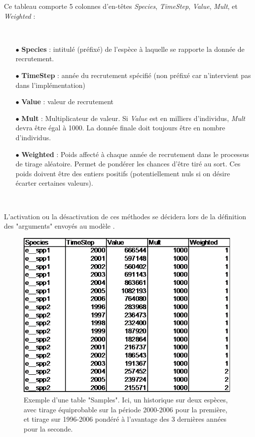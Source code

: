 \documentclass[12pt, colorinlistoftodos, notitlepage]{report}
\newenvironment{not used}[1]{%
    \longtable{%
        |>{\centering$\displaystyle}A{#1}{1}<{$}%
        |}\hline\ignorespaces}{%
    \endlongtable\ignorespacesafterend}
\begin{document}
Ce tableau comporte 5 colonnes d'en-têtes \textit{Species}, \textit{TimeStep}, \textit{Value}, \textit{Mult}, et \textit{Weighted} :

\par~\par

\begin{itemize}
    \item[$\bullet$] \textbf{Species} : intitulé (préfixé) de l'espèce à laquelle se rapporte la donnée de recrutement.
    \item[$\bullet$] \textbf{TimeStep} : année du recrutement spécifié (non préfixé car n'intervient pas dans l'implémentation)
    \item[$\bullet$] \textbf{Value} : valeur de recrutement
    \item[$\bullet$] \textbf{Mult} : Multiplicateur de valeur. Si \textit{Value} est en milliers d'individus, \textit{Mult} devra être égal à 1000. La donnée finale doit toujours être en nombre d'individus.
    \item[$\bullet$] \textbf{Weighted} : Poids affecté à chaque année de recrutement dans le processus de tirage aléatoire. Permet de pondérer les chances d'être tiré au sort. Ces poids doivent être des entiers positifs (potentiellement nuls si on désire écarter certaines valeurs).
\end{itemize}

\par~\par

L'activation ou la désactivation de ces méthodes se décidera lors de la définition des "arguments" envoyés au modèle . 
  
\begin{figure}[h!]
    \begin{center}
    \includegraphics[width = 11.19cm]{figures/param/stock14.png}
    \end{center}
    \caption{Exemple d'une table "Samples". Ici, un historique sur deux espèces, avec tirage équiprobable sur la période 2000-2006 pour la première, et tirage sur 1996-2006 pondéré à l'avantage des 3 dernières années pour la seconde.}
    \label{fig:recru}
\end{figure}
\end{document}

